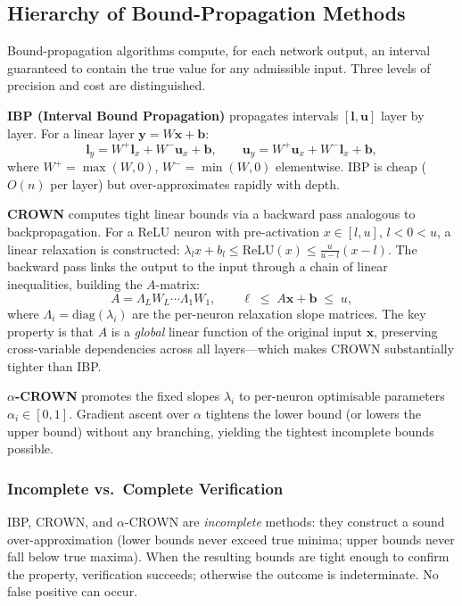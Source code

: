\documentclass[11pt]{article}
\begin{document}
\subsection{Hierarchy of Bound-Propagation Methods}

Bound-propagation algorithms compute, for each network output, an interval
guaranteed to contain the true value for any admissible input. Three levels of
precision and cost are distinguished.

\textbf{IBP (Interval Bound Propagation)} \citep{CROWNPaper} propagates
intervals $[\mathbf{l}, \mathbf{u}]$ layer by layer. For a linear layer
$\mathbf{y} = W\mathbf{x} + \mathbf{b}$:
\[
  \mathbf{l}_y = W^+\mathbf{l}_x + W^-\mathbf{u}_x + \mathbf{b},\qquad
  \mathbf{u}_y = W^+\mathbf{u}_x + W^-\mathbf{l}_x + \mathbf{b},
\]
where $W^+ = \max(W, 0)$, $W^- = \min(W, 0)$ elementwise. IBP is cheap
($O(n)$ per layer) but over-approximates rapidly with depth.

\textbf{CROWN} \citep{CROWNPaper} computes tight linear bounds via a backward
pass analogous to backpropagation. For a ReLU neuron with pre-activation
$x \in [l, u]$, $l < 0 < u$, a linear relaxation is constructed:
$\lambda_l x + b_l \leq \mathrm{ReLU}(x) \leq \frac{u}{u-l}(x - l)$.
The backward pass links the output to the input through a chain of linear
inequalities, building the $A$-matrix:
\begin{equation}
  A = \Lambda_L W_L \cdots \Lambda_1 W_1,\qquad
  \ell \;\leq\; A\mathbf{x} + \mathbf{b} \;\leq\; u,
  \label{eq:crown}
\end{equation}
where $\Lambda_i = \mathrm{diag}(\lambda_i)$ are the per-neuron relaxation
slope matrices. The key property is that $A$ is a \emph{global} linear
function of the original input $\mathbf{x}$, preserving cross-variable
dependencies across all layers---which makes CROWN substantially tighter than
IBP.

\textbf{$\alpha$-CROWN} \citep{AlphaBetaCrownVNNCOMP23} promotes the fixed
slopes $\lambda_i$ to per-neuron optimisable parameters $\alpha_i \in [0,1]$.
Gradient ascent over $\alpha$ tightens the lower bound (or lowers the upper
bound) without any branching, yielding the tightest incomplete bounds possible.

\subsubsection{Incomplete vs.\ Complete Verification}

IBP, CROWN, and $\alpha$-CROWN are \emph{incomplete} methods: they construct
a sound over-approximation (lower bounds never exceed true minima; upper bounds
never fall below true maxima). When the resulting bounds are tight enough to
confirm the property, verification succeeds; otherwise the outcome is
indeterminate. No false positive can occur.
\end{document}
